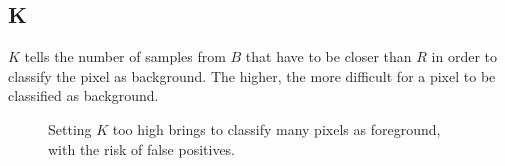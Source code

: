 \subsection*{K}
$K$ tells the number of samples from $B$ that have to be closer than $R$ in order to
classify the pixel as background. The higher, the more difficult for a pixel to be
classified as background.
\begin{figure}[!t]
\centering
{}
\newline
{}
\newline
{}
\caption{Setting $K$ too high brings to classify many pixels as foreground, with the risk of false positives.}
\end{figure}

